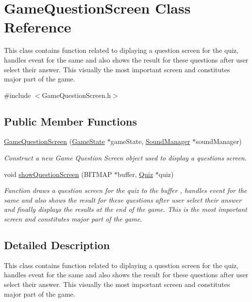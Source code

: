 \hypertarget{class_game_question_screen}{}\section{Game\+Question\+Screen Class Reference}
\label{class_game_question_screen}


This class contains function related to diplaying a question screen for the quiz, handles event for the same and also shows the result for these questions after user select their answer. This visually the most important screen and constitutes major part of the game.  




{\ttfamily \#include $<$Game\+Question\+Screen.\+h$>$}

\subsection*{Public Member Functions}
\begin{DoxyCompactItemize}
\item 
\mbox{\hyperlink{class_game_question_screen_a85740c09f0dd41c8fdece027059e6974}{Game\+Question\+Screen}} (\mbox{\hyperlink{struct_game_state}{Game\+State}} $\ast$game\+State, \mbox{\hyperlink{class_sound_manager}{Sound\+Manager}} $\ast$sound\+Manager)
\begin{DoxyCompactList}\small\item\em Construct a new Game Question Screen object used to display a questions screen. \end{DoxyCompactList}\item 
void \mbox{\hyperlink{class_game_question_screen_a78a1bda4b73ba96ea09d04ddd378e60d}{show\+Question\+Screen}} (B\+I\+T\+M\+AP $\ast$buffer, \mbox{\hyperlink{class_quiz}{Quiz}} $\ast$quiz)
\begin{DoxyCompactList}\small\item\em Function draws a question screen for the quiz to the buffer , handles event for the same and also shows the result for these questions after user select their answer and finally displays the results at the end of the game. This is the most important screen and constitutes major part of the game. \end{DoxyCompactList}\end{DoxyCompactItemize}


\subsection{Detailed Description}
This class contains function related to diplaying a question screen for the quiz, handles event for the same and also shows the result for these questions after user select their answer. This visually the most important screen and constitutes major part of the game. 



